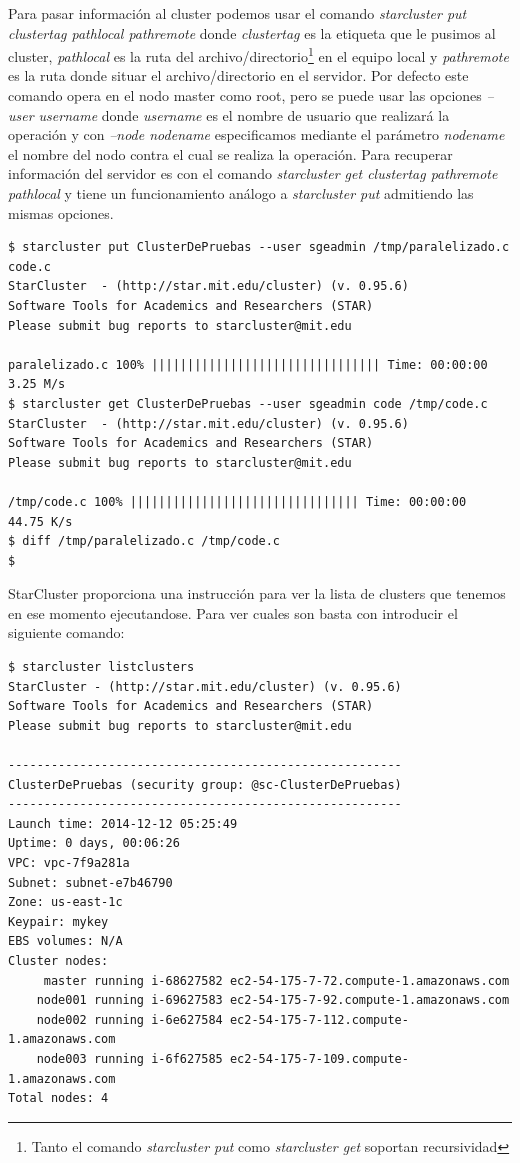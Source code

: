 \documentclass{article}
\begin{document}
	Para pasar información al cluster podemos usar el comando \emph{starcluster put clustertag pathlocal pathremote} donde \emph{clustertag} es la etiqueta que le pusimos al cluster, \emph{pathlocal} es la ruta del archivo/directorio\footnote{Tanto el comando \emph{starcluster put} como \emph{starcluster get} soportan recursividad} en el equipo local y \emph{pathremote} es la ruta donde situar el archivo/directorio en el servidor. Por defecto este comando opera en el nodo master como root, pero se puede usar las opciones \emph{--user username} donde \emph{username} es el nombre de usuario que realizará la operación y con \emph{--node nodename} especificamos mediante el parámetro \emph{nodename} el nombre del nodo contra el cual se realiza la operación. Para recuperar información del servidor es con el comando \emph{starcluster get clustertag pathremote pathlocal} y tiene un funcionamiento análogo a \emph{starcluster put} admitiendo las mismas opciones.
\begin{lstlisting}[style=miniBash]
$ starcluster put ClusterDePruebas --user sgeadmin /tmp/paralelizado.c code.c
StarCluster  - (http://star.mit.edu/cluster) (v. 0.95.6)
Software Tools for Academics and Researchers (STAR)
Please submit bug reports to starcluster@mit.edu

paralelizado.c 100% |||||||||||||||||||||||||||||||| Time: 00:00:00   3.25 M/s
$ starcluster get ClusterDePruebas --user sgeadmin code /tmp/code.c
StarCluster  - (http://star.mit.edu/cluster) (v. 0.95.6)
Software Tools for Academics and Researchers (STAR)
Please submit bug reports to starcluster@mit.edu

/tmp/code.c 100% |||||||||||||||||||||||||||||||| Time: 00:00:00   44.75 K/s
$ diff /tmp/paralelizado.c /tmp/code.c
$
\end{lstlisting}

	StarCluster proporciona una instrucción para ver la lista de clusters que tenemos en ese momento ejecutandose. Para ver cuales son basta con introducir el siguiente comando:
\begin{lstlisting}[style=miniBash]	
$ starcluster listclusters
StarCluster - (http://star.mit.edu/cluster) (v. 0.95.6)
Software Tools for Academics and Researchers (STAR)
Please submit bug reports to starcluster@mit.edu

-------------------------------------------------------
ClusterDePruebas (security group: @sc-ClusterDePruebas)
-------------------------------------------------------
Launch time: 2014-12-12 05:25:49
Uptime: 0 days, 00:06:26
VPC: vpc-7f9a281a
Subnet: subnet-e7b46790
Zone: us-east-1c
Keypair: mykey
EBS volumes: N/A
Cluster nodes:
     master running i-68627582 ec2-54-175-7-72.compute-1.amazonaws.com
    node001 running i-69627583 ec2-54-175-7-92.compute-1.amazonaws.com
    node002 running i-6e627584 ec2-54-175-7-112.compute-1.amazonaws.com
    node003 running i-6f627585 ec2-54-175-7-109.compute-1.amazonaws.com
Total nodes: 4

\end{lstlisting}
	
\end{document}
